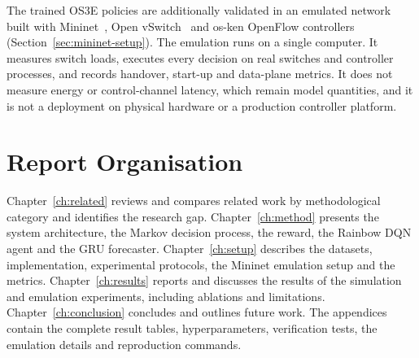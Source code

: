 The trained OS3E policies are additionally validated in an emulated network built with Mininet~\cite{lantz2010mininet}, Open vSwitch~\cite{pfaff2015ovs} and os-ken OpenFlow controllers~\cite{osken2024} (Section~\ref{sec:mininet-setup}). The emulation runs on a single computer. It measures switch loads, executes every decision on real switches and controller processes, and records handover, start-up and data-plane metrics. It does not measure energy or control-channel latency, which remain model quantities, and it is not a deployment on physical hardware or a production controller platform.

\section{Report Organisation}

Chapter~\ref{ch:related} reviews and compares related work by methodological category and identifies the research gap. Chapter~\ref{ch:method} presents the system architecture, the Markov decision process, the reward, the Rainbow DQN agent and the GRU forecaster. Chapter~\ref{ch:setup} describes the datasets, implementation, experimental protocols, the Mininet emulation setup and the metrics. Chapter~\ref{ch:results} reports and discusses the results of the simulation and emulation experiments, including ablations and limitations. Chapter~\ref{ch:conclusion} concludes and outlines future work. The appendices contain the complete result tables, hyperparameters, verification tests, the emulation details and reproduction commands.
